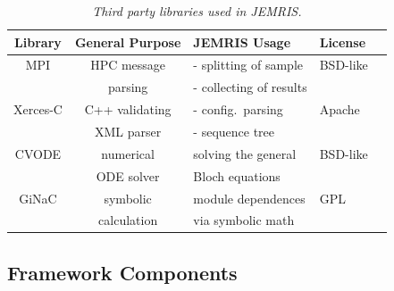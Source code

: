 \documentclass[journal,onecolumn,12pt]{IEEEtran}
\begin{document}
 \begin{table}[htp]
  \begin{center}
  \begin{tabular}{|c|c|l|l|l|}
  \hline
  Library	& General Purpose & JEMRIS Usage		& License 	\\
  \hline
  \hline
  MPI 		& HPC message   & - splitting of sample		&  BSD-like	\\
  \cite{mpi}	& parsing	& - collecting of results	&		\\
  \hline
  Xerces-C 	& C++  validating & - config.~parsing		& Apache	\\
  \cite{xercesc}& XML parser      & - sequence tree		&		\\
  \hline
  CVODE 	& numerical     & solving the general		& BSD-like	\\
  \cite{cvode}	& ODE solver	& Bloch equations		&		\\
  \hline
  GiNaC 	& symbolic      & module dependences		& GPL     	\\
  \cite{ginac}  & calculation   & via symbolic math		&		\\
  \hline
  \end{tabular}
  \end{center}
  \caption{\label{tab:libraries} {\it Third party libraries used in JEMRIS.}}
 \end{table}



\subsection{Framework Components}
\end{document}
